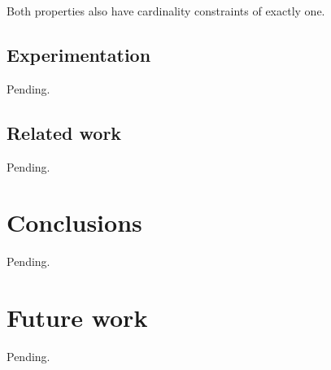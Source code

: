 \documentclass[a4paper, 10pt]{article}
\begin{document}
Both properties also have cardinality constraints of exactly one.


\subsection{Experimentation}

Pending.


\subsection{Related work}

Pending.


\section{Conclusions}

Pending.


\section{Future work}

Pending.


%
%
\end{document}
